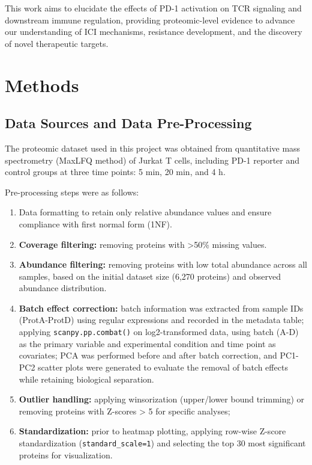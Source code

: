 \documentclass{article}
\begin{document}
    This work aims to elucidate the effects of PD-1 activation on TCR signaling and downstream immune regulation, providing proteomic-level evidence to advance our understanding of ICI mechanisms, resistance development, and the discovery of novel therapeutic targets.

  \section{Methods}

    \subsection{Data Sources and Data Pre-Processing}

      The proteomic dataset used in this project was obtained from quantitative mass spectrometry (MaxLFQ method) of Jurkat T cells, including PD-1 reporter and control groups at three time points: 5 min, 20 min, and 4 h. 

      Pre-processing steps were as follows:

      \begin{enumerate}
        \item Data formatting to retain only relative abundance values and ensure compliance with first normal form (1NF).
        \item \textbf{Coverage filtering:} removing proteins with >50\% missing values.
        \item \textbf{Abundance filtering:} removing proteins with low total abundance across all samples, based on the initial dataset size (6,270 proteins) and observed abundance distribution.
        \item \textbf{Batch effect correction:} batch information was extracted from sample IDs (ProtA-ProtD) using regular expressions and recorded in the metadata table; applying \texttt{scanpy.pp.combat()} on log2-transformed data, using batch (A-D) as the primary variable and experimental condition and time point as covariates; PCA was performed before and after batch correction, and PC1-PC2 scatter plots were generated to evaluate the removal of batch effects while retaining biological separation.
        \item \textbf{Outlier handling:} applying winsorization (upper/lower bound trimming) or removing proteins with Z-scores > 5 for specific analyses;
        \item \textbf{Standardization:} prior to heatmap plotting, applying row-wise Z-score standardization (\texttt{standard\_scale=1}) and selecting the top 30 most significant proteins for visualization.
      \end{enumerate}
\end{document}
